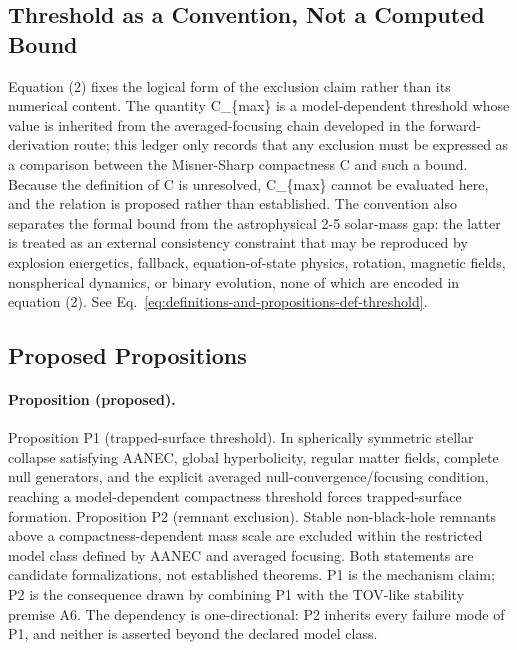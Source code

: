 \documentclass[conference]{IEEEtran}
\begin{document}
\subsection{Threshold as a Convention, Not a Computed Bound}
Equation (2) fixes the logical form of the exclusion claim rather than its numerical content. The quantity C\_\{max\} is a model-dependent threshold whose value is inherited from the averaged-focusing chain developed in the forward-derivation route; this ledger only records that any exclusion must be expressed as a comparison between the Misner-Sharp compactness C and such a bound. Because the definition of C is unresolved, C\_\{max\} cannot be evaluated here, and the relation is proposed rather than established. The convention also separates the formal bound from the astrophysical 2-5 solar-mass gap: the latter is treated as an external consistency constraint that may be reproduced by explosion energetics, fallback, equation-of-state physics, rotation, magnetic fields, nonspherical dynamics, or binary evolution, none of which are encoded in equation (2). See Eq.~\eqref{eq:definitions-and-propositions-def-threshold}.

\subsection{Proposed Propositions}
\paragraph{Proposition (proposed).} Proposition P1 (trapped-surface threshold). In spherically symmetric stellar collapse satisfying AANEC, global hyperbolicity, regular matter fields, complete null generators, and the explicit averaged null-convergence/focusing condition, reaching a model-dependent compactness threshold forces trapped-surface formation. Proposition P2 (remnant exclusion). Stable non-black-hole remnants above a compactness-dependent mass scale are excluded within the restricted model class defined by AANEC and averaged focusing. Both statements are candidate formalizations, not established theorems. P1 is the mechanism claim; P2 is the consequence drawn by combining P1 with the TOV-like stability premise A6. The dependency is one-directional: P2 inherits every failure mode of P1, and neither is asserted beyond the declared model class.
\end{document}
